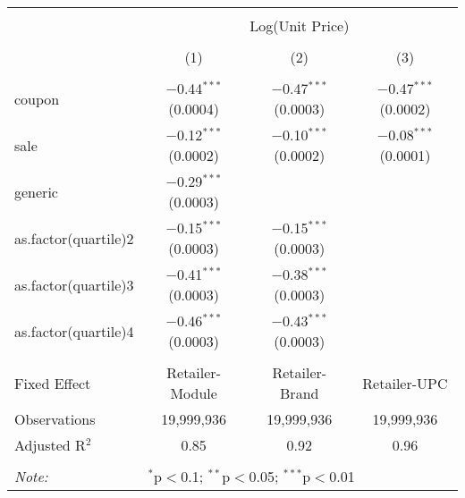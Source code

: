 
\begin{table}[!htbp] \centering 
  \caption{} 
  \label{tab:overallSavingsNonStorable} 
\begin{tabular}{@{\extracolsep{5pt}}lccc} 
\\[-1.8ex]\hline 
\hline \\[-1.8ex] 
 & \multicolumn{3}{c}{Log(Unit Price)} \\ 
\\[-1.8ex] & (1) & (2) & (3)\\ 
\hline \\[-1.8ex] 
 coupon & $-$0.44$^{***}$ (0.0004) & $-$0.47$^{***}$ (0.0003) & $-$0.47$^{***}$ (0.0002) \\ 
  sale & $-$0.12$^{***}$ (0.0002) & $-$0.10$^{***}$ (0.0002) & $-$0.08$^{***}$ (0.0001) \\ 
  generic & $-$0.29$^{***}$ (0.0003) &  &  \\ 
  as.factor(quartile)2 & $-$0.15$^{***}$ (0.0003) & $-$0.15$^{***}$ (0.0003) &  \\ 
  as.factor(quartile)3 & $-$0.41$^{***}$ (0.0003) & $-$0.38$^{***}$ (0.0003) &  \\ 
  as.factor(quartile)4 & $-$0.46$^{***}$ (0.0003) & $-$0.43$^{***}$ (0.0003) &  \\ 
 \hline \\[-1.8ex] 
Fixed Effect & Retailer-Module & Retailer-Brand & Retailer-UPC \\ 
Observations & 19,999,936 & 19,999,936 & 19,999,936 \\ 
Adjusted R$^{2}$ & 0.85 & 0.92 & 0.96 \\ 
\hline 
\hline \\[-1.8ex] 
\textit{Note:}  & \multicolumn{3}{l}{$^{*}$p$<$0.1; $^{**}$p$<$0.05; $^{***}$p$<$0.01} \\ 
\end{tabular} 
\end{table} 
